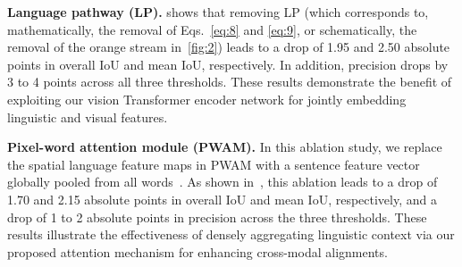 \documentclass[10pt,twocolumn,letterpaper]{article}
\begin{document}
\noindent \textbf{Language pathway (LP).}
 shows that removing LP (which corresponds to, mathematically, the removal of Eqs.~\ref{eq:8} and \ref{eq:9}, or schematically, the removal of the orange stream in~\cref{fig:2}) leads to a drop of 1.95 and 2.50 absolute points in overall IoU and mean IoU, respectively.
In addition, precision drops by 3 to 4 points across all three thresholds.
These results demonstrate the benefit of exploiting our vision Transformer encoder network for jointly embedding linguistic and visual features.

\noindent \textbf{Pixel-word attention module (PWAM).}
In this ablation study, we replace the spatial language feature maps  in PWAM with a sentence feature vector globally pooled from all words~\cite{bmvc2021yang}.
As shown in~, this ablation leads to a drop of 1.70 and 2.15 absolute points in overall IoU and mean IoU, respectively, and a drop of 1 to 2 absolute points in precision across the three thresholds.
These results illustrate the effectiveness of densely aggregating linguistic context via our proposed attention mechanism for enhancing cross-modal alignments.


\begin{table}[t]
   \centering
   \caption{Main ablation results on the RefCOCO validation set.}
   \label{tab:2}
\end{table}
\end{document}
